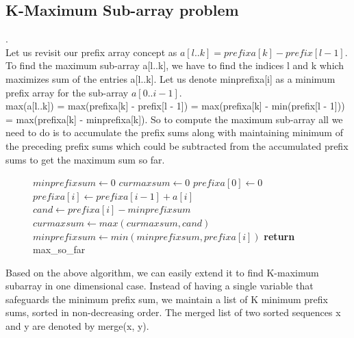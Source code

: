 \subsection{K-Maximum Sub-array problem}
\qquad {}.
\vspace{1mm}\\
Let us revisit our prefix array concept as $a[l..k] = prefixa[k] - prefix[l - 1]$. To find the maximum sub-array a[l..k], we have to find the indices l and k which maximizes sum of the entries a[l..k]. Let us denote minprefixa[i] as a minimum prefix array for the sub-array $a[0..i - 1]$.\\
max(a[l..k]) = max(prefixa[k] - prefix[l - 1]) = max(prefixa[k] - min(prefix[l - 1])) = max(prefixa[k] - minprefixa[k]). So to compute the maximum sub-array all we need to do is to accumulate the prefix sums along with maintaining minimum of the preceding prefix sums which could be subtracted from the accumulated prefix sums to get the maximum sum so far. 

\begin{figure}[H]
\begin{center}
\end{center}
\begin{algorithmic}[1]
    \State $minprefixsum \gets 0$
    \State $curmaxsum \gets 0$
    \State $prefixa[0] \gets 0$
           \State $prefixa[i] \gets prefixa[i - 1] + a[i]$
           \State $cand \gets prefixa[i] - minprefixsum$
           \State $curmaxsum \gets max(curmaxsum, cand)$
           \State $minprefixsum \gets min(minprefixsum, prefixa[i])$
        \EndFor
    \State \textbf{return} max\_so\_far
\EndFunction
\end{algorithmic}
\end{figure}

Based on the above algorithm, we can easily extend it to find K-maximum subarray in one dimensional case. Instead of having a single variable that safeguards the minimum prefix sum, we maintain a list of K minimum prefix sums, sorted in non-decreasing order. The merged list of two sorted sequences x and y are denoted by merge(x, y).

